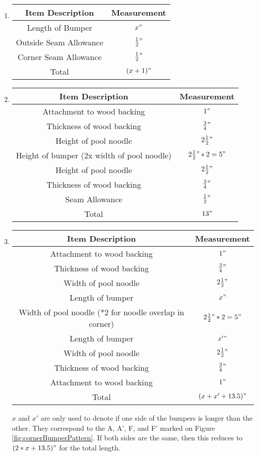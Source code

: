 \documentclass[
10pt, %
a4paper, %
oneside, %
headinclude,footinclude, %
BCOR5mm, %
]{scrartcl}
\begin{document}
\begin{enumerate}[label=\Alph*]

	\item %
	\begin{tabular}{|c|c|}
		\hline
		Item Description & Measurement \\ \hline
		Length of Bumper & $x"$ \\ \hline
		Outside Seam Allowance & $\frac{1}{2}"$ \\ \hline
		Corner Seam Allowance & $\frac{1}{2}"$ \\ \hline
		Total & $(x + 1)"$ \\ \hline
	\end{tabular}

	\item %
	\begin{tabular}{|c|c|}
		\hline
		Item Description & Measurement \\ \hline
		Attachment to wood backing & $1"$ \\ \hline
		Thickness of wood backing & $\frac{3}{4}"$ \\ \hline
		Height of pool noodle & $2\frac{1}{2}"$ \\ \hline
		Height of bumper (2x width of pool noodle) & $2\frac{1}{2}" * 2 = 5"$ \\ \hline
		Height of pool noodle & $2\frac{1}{2}"$ \\ \hline
		Thickness of wood backing & $\frac{3}{4}"$ \\ \hline
		Seam Allowance & $\frac{1}{2}"$\\ \hline
		Total & $13"$ \\ \hline
	\end{tabular}
	
	\item %
	\begin{tabular}{|c|c|}
		\hline
		Item Description & Measurement \\ \hline
		Attachment to wood backing & $1"$ \\ \hline
		Thickness of wood backing & $\frac{3}{4}"$ \\ \hline
		Width of pool noodle & $2\frac{1}{2}"$ \\ \hline
		Length of bumper & $x"$ \\ \hline
		Width of pool noodle (*2 for noodle overlap in corner) & $2\frac{1}{2}" * 2 = 5"$ \\ \hline
		Length of bumper & $x'"$ \\ \hline
		Width of pool noodle & $2\frac{1}{2}"$ \\ \hline
		Thickness of wood backing & $\frac{3}{4}"$ \\ \hline
		Attachment to wood backing & $1"$ \\ \hline
		Total & $(x + x' + 13.5)"$ \\ \hline
	\end{tabular}
	$x$ and $x'$ are only used to denote if one side of the bumpers is longer than the other. They correspond to the A, A', F, and F' marked on Figure  \ref{fig:cornerBumperPattern}. If both sides are the same, then this reduces to $(2*x + 13.5)"$ for the total length.


\end{enumerate}
\end{document}
